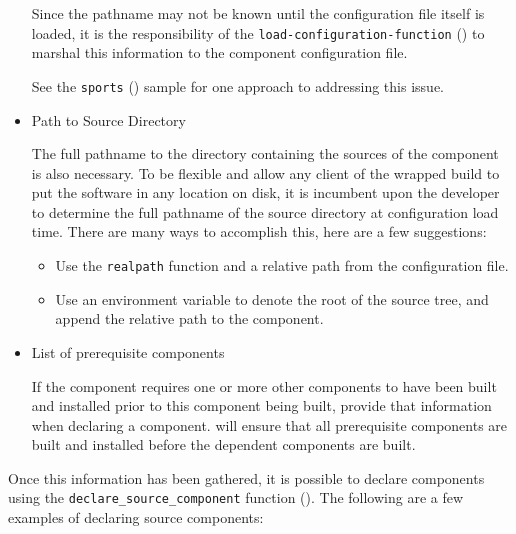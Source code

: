 \begin{itemize}
  Since the pathname may not be known until the configuration file
  itself is loaded, it is the responsibility of the
  \texttt{load-configuration-function}
  () to marshal this
  information to the component configuration file.

  See the \texttt{sports} () sample for one
  approach to addressing this issue.

\item{Path to Source Directory}

  The full pathname to the directory containing the sources of the
  component is also necessary.  To be flexible and allow any client of
  the wrapped build to put the software in any location on disk, it is
  incumbent upon the developer to determine the full pathname of the
  source directory at configuration load time.  There are many ways to
  accomplish this, here are a few suggestions:

  \begin{itemize}
    \item Use the \gnumake \texttt{realpath} function and a relative path from
      the configuration file.
    \item Use an environment variable to denote the root of the source
      tree, and append the relative path to the component.
  \end{itemize}

\item{List of prerequisite components}

  If the component requires one or more other components to have been
  built and installed prior to this component being built, provide
  that information when declaring a component.  \lmsbw will ensure
  that all prerequisite components are built and installed before the
  dependent components are built.
\end{itemize}

Once this information has been gathered, it is possible to declare
components using the \texttt{declare\_source\_component} function
().  The following are a few
examples of declaring source components:

